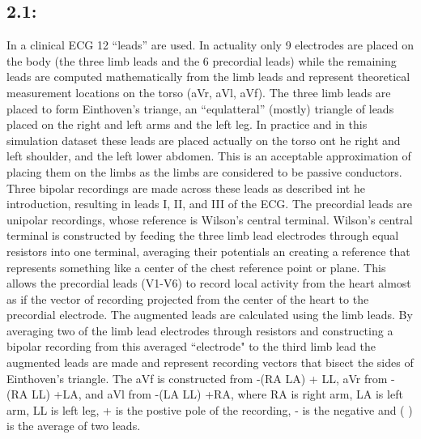 \documentclass[12pt]{article}
\begin{document}
\subsection{2.1: }
In a clinical ECG 12 ``leads'' are used. In actuality only 9 electrodes are placed on the body (the three limb leads and the 6 precordial leads) while the remaining leads are computed mathematically from the limb leads and represent theoretical measurement locations on the torso (aVr, aVl, aVf). The three limb leads are placed to form Einthoven's triange, an ``equlatteral'' (mostly) triangle of leads placed on the right and left arms and the left leg. In practice and in this simulation dataset these leads are placed actually on the torso ont he right and left shoulder, and the left lower abdomen. This is an acceptable approximation of placing them on the limbs as the limbs are considered to be passive conductors. Three bipolar recordings are made across these leads as described int he introduction, resulting in leads I, II, and III of the ECG. The precordial leads are unipolar recordings, whose reference is Wilson's central terminal. Wilson's central terminal is constructed by feeding the three limb lead electrodes through equal resistors into one terminal, averaging their potentials an creating a reference that represents something like a center of the chest reference point or plane. This allows the precordial leads (V1-V6) to record local activity from the heart almost as if the vector of recording projected from the center of the heart to the precordial electrode. The augmented leads are calculated using the limb leads. By averaging two of the limb lead electrodes through resistors and constructing a bipolar recording from this averaged ``electrode" to the third limb lead the augmented leads are made and represent recording vectors that bisect the sides of Einthoven's triangle. The aVf is constructed from -(RA LA) + LL, aVr from -(RA LL) +LA, and aVl from -(LA LL) +RA, where RA is right arm, LA is left arm, LL is left leg, + is the postive pole of the recording, - is the negative and ( ) is the average of two leads.
\end{document}
